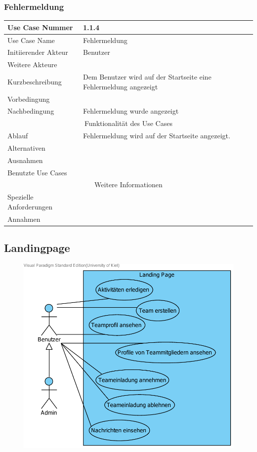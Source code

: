 \documentclass[10pt,a4paper]{article}
\begin{document}
\subsubsection{Fehlermeldung} %
	\begin{tabularx}{\textwidth}{|l|X|}
	\hline Use Case Nummer & 1.1.4 \\ 
	\hline Use Case Name & Fehlermeldung \\ 
	\hline Initiierender Akteur & Benutzer \\
	\hline Weitere Akteure &  \\
	\hline Kurzbeschreibung & Dem Benutzer wird auf der Startseite eine Fehlermeldung angezeigt \\
	\hline Vorbedingung &  \\
	\hline Nachbedingung & Fehlermeldung wurde angezeigt \\
	\hline \multicolumn{2}{|c|}{Funktionalität des Use Cases}\\
	\hline Ablauf & Fehlermeldung wird auf der Startseite angezeigt. \\
	\hline Alternativen &  \\
	\hline Ausnahmen &  \\
	\hline Benutzte Use Cases &  \\
	\hline \multicolumn{2}{|c|}{Weitere Informationen} \\
	\hline Spezielle Anforderungen &  \\
	\hline Annahmen &  \\
	\hline
	\end{tabularx}
                
\subsection{Landingpage}

		\begin{figure}[H]
			\includegraphics[width=\linewidth]{gfx/webseite/LandingPage.pdf}
		\end{figure}
\end{document}
